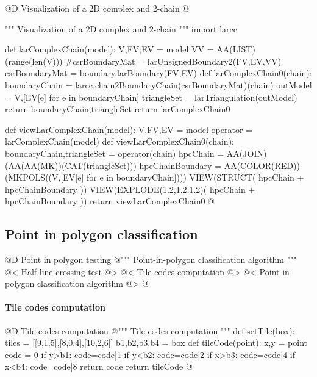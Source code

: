 \documentclass[11pt,oneside]{article}    %
\begin{document}
@D Visualization of a 2D complex and 2-chain
@{""" Visualization of a 2D complex and 2-chain """
import larcc

def larComplexChain(model):
    V,FV,EV = model
    VV = AA(LIST)(range(len(V)))
    #csrBoundaryMat = larUnsignedBoundary2(FV,EV,VV)
    csrBoundaryMat = boundary.larBoundary(FV,EV)
    def larComplexChain0(chain):
        boundaryChain = larcc.chain2BoundaryChain(csrBoundaryMat)(chain)
        outModel = V,[EV[e] for e in boundaryChain]
        triangleSet = larTriangulation(outModel)
        return boundaryChain,triangleSet
    return larComplexChain0
    
def viewLarComplexChain(model):
    V,FV,EV = model
    operator = larComplexChain(model)
    def viewLarComplexChain0(chain):
        boundaryChain,triangleSet = operator(chain)
        hpcChain = AA(JOIN)(AA(AA(MK))(CAT(triangleSet)))
        hpcChainBoundary = AA(COLOR(RED))(MKPOLS((V,[EV[e] for e in boundaryChain])))
        VIEW(STRUCT( hpcChain + hpcChainBoundary ))
        VIEW(EXPLODE(1.2,1.2,1.2)( hpcChain + hpcChainBoundary ))
    return viewLarComplexChain0
@}




\subsection{Point in polygon classification}


@D Point in polygon testing
@{""" Point-in-polygon classification algorithm """
@< Half-line crossing test @>
@< Tile codes computation @>
@< Point-in-polygon classification algorithm @>
@}

\paragraph{Tile codes computation}
@D Tile codes computation
@{""" Tile codes computation """
def setTile(box):
    tiles = [[9,1,5],[8,0,4],[10,2,6]]
    b1,b2,b3,b4 = box
    def tileCode(point):
        x,y = point
        code = 0
        if y>b1: code=code|1
        if y<b2: code=code|2
        if x>b3: code=code|4
        if x<b4: code=code|8
        return code 
    return tileCode
@}
\end{document}
